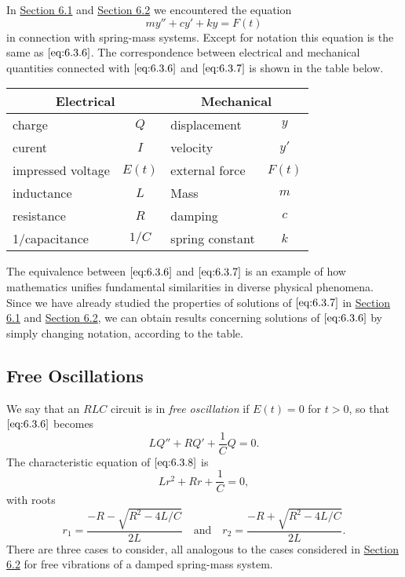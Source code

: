 \documentclass{ximera}
\begin{document}
In  \href{https://xerxes.ximera.org/differentialequations/main/springProblemsI/springProblemsI}{Section 6.1} and \href{https://xerxes.ximera.org/differentialequations/main/springProblemsII/springProblemsII}{Section 6.2} we encountered the
equation
\begin{equation} \label{eq:6.3.7}
my''+cy'+ky=F(t)
\end{equation}
in connection with spring-mass systems. Except for notation this
equation is the same as $\eqref{eq:6.3.6}$. The correspondence between
electrical and mechanical quantities connected with $\eqref{eq:6.3.6}$ and
$\eqref{eq:6.3.7}$ is shown in the table below.

\begin{center}
\begin{tabular}{|lc|lc|}\hline
\multicolumn{2}{|c|}{\bf Electrical}&
\multicolumn{2}{c|}{\bf Mechanical}\\\hline
charge& $Q$& displacement&$y$\\\hline
curent&$I$&velocity&$y'$\\\hline
impressed voltage&$E(t)$&external force&$F(t)$\\\hline
inductance&$L$&Mass&$m$\\\hline
resistance&$R$&damping&$c$\\\hline
1/capacitance&$1/C$&spring constant&$k$\\\hline
\end{tabular}
\end{center}

The equivalence between $\eqref{eq:6.3.6}$ and $\eqref{eq:6.3.7}$ is an example of how mathematics unifies fundamental similarities in diverse physical phenomena. Since we have already studied the properties of solutions of
$\eqref{eq:6.3.7}$ in \href{https://xerxes.ximera.org/differentialequations/main/springProblemsI/springProblemsI}{Section 6.1} and \href{https://xerxes.ximera.org/differentialequations/main/springProblemsII/springProblemsII}{Section 6.2}, we
can obtain results concerning solutions of $\eqref{eq:6.3.6}$ by simply changing
notation, according to the table.

\subsection*{Free Oscillations}

We say that an $RLC$ circuit is in \textit{free oscillation} if $E(t)=0$
for $t>0$, so that $\eqref{eq:6.3.6}$ becomes
\begin{equation} \label{eq:6.3.8}
LQ''+RQ'+\frac{1}{C}Q=0.
\end{equation}
The characteristic equation of $\eqref{eq:6.3.8}$ is
$$
Lr^2+Rr+\frac{1}{C}=0,
$$
with roots
\begin{equation}\label{eq:6.3.9}
r_1=\frac{-R-\sqrt{R^2-4L/C}}{2L}\quad\mbox{and}\quad r_2=
\frac{-R+\sqrt{R^2-4L/C}}{2L}.
\end{equation}
There are three cases to consider, all analogous to the cases considered in \href{https://xerxes.ximera.org/differentialequations/main/springProblemsII/springProblemsII}{Section 6.2} for free vibrations of a damped
spring-mass system.
\end{document}
